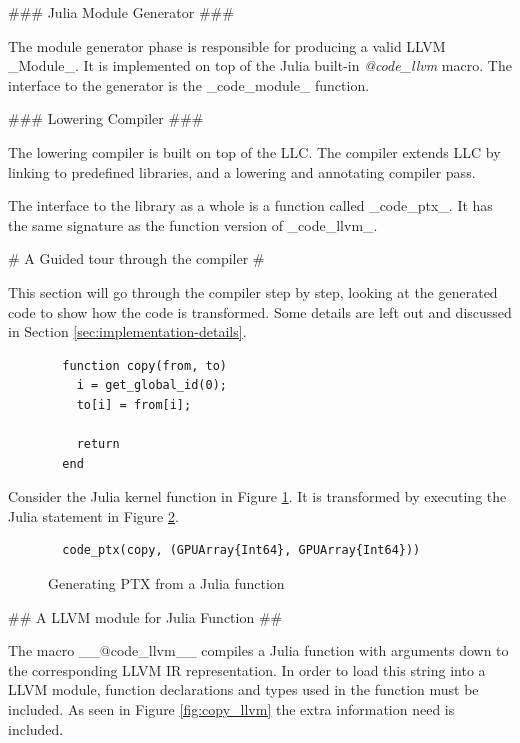 \begin{markdown}
### Julia Module Generator ###

The module generator phase is responsible for producing a valid LLVM
_Module_. It is implemented on top of the Julia built-in
\textit{@code_llvm} macro. The interface to the generator is the
_code_module_ function.

### Lowering Compiler ###

The lowering compiler is built on top of the \gls{LLC}. The compiler
extends \gls{LLC} by linking to predefined libraries, and a lowering
and annotating compiler pass.

The interface to the library as a whole is a function called
_code_ptx_. It has the same signature as the function version of
_code_llvm_.

# A Guided tour through the compiler #

This section will go through the compiler step by step, looking at the
generated code to show how the code is transformed. Some details are
left out and discussed in Section \ref{sec:implementation-details}.


\begin{figure}[H]
  \begin{verbatim}
  function copy(from, to)
    i = get_global_id(0);
    to[i] = from[i];
  
    return
  end
  \end{verbatim}
  \caption{}
  \label{fig:julia-copy}
\end{figure}

Consider the Julia kernel function in Figure \ref{fig:julia-copy}. It
is transformed by executing the Julia statement in Figure
\ref{fig:impl:code_ptx}.

\begin{figure}[H]
  \begin{verbatim}
  code_ptx(copy, (GPUArray{Int64}, GPUArray{Int64}))
  \end{verbatim}
  \caption{Generating PTX from a Julia function}
  \label{fig:impl:code_ptx}
\end{figure}


## A LLVM module for Julia Function ##

The macro __@code\_llvm__ compiles a Julia function with arguments
down to the corresponding LLVM IR representation. In order to load
this string into a LLVM module, function declarations and types used
in the function must be included. As seen in Figure
\ref{fig:copy_llvm} the extra information need is included. 


\end{markdown}
